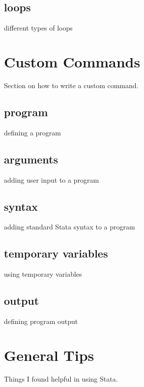 \documentclass[12pt, a4paper]{article}
\begin{document}
\subsection{loops}

different types of loops

\section{Custom Commands}

Section on how to write a custom command.

\subsection{program}

defining a program

\subsection{arguments}

adding user input to a program

\subsection{syntax}

adding standard Stata syntax to a program

\subsection{temporary variables}

using temporary variables

\subsection{output}

defining program output

\section{General Tips}

Things I found helpful in using Stata.
\end{document}
